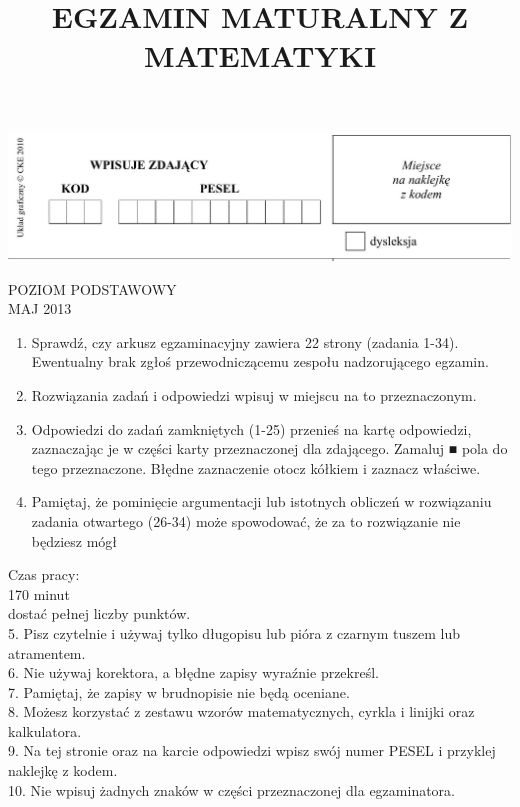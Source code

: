\documentclass[10pt]{article}
\title{EGZAMIN MATURALNY Z MATEMATYKI }
\author{}
\date{}
\begin{document}
\maketitle
\begin{center}
\includegraphics[max width=\textwidth]{2024_11_21_e0e8aab895018a50a9a7g-01}
\end{center}

POZIOM PODSTAWOWY\\
MAJ 2013

\begin{enumerate}
  \item Sprawdź, czy arkusz egzaminacyjny zawiera 22 strony (zadania 1-34). Ewentualny brak zgłoś przewodniczącemu zespołu nadzorującego egzamin.
  \item Rozwiązania zadań i odpowiedzi wpisuj w miejscu na to przeznaczonym.
  \item Odpowiedzi do zadań zamkniętych (1-25) przenieś na kartę odpowiedzi, zaznaczając je w części karty przeznaczonej dla zdającego. Zamaluj ■ pola do tego przeznaczone. Błędne zaznaczenie otocz kółkiem i zaznacz właściwe.
  \item Pamiętaj, że pominięcie argumentacji lub istotnych obliczeń w rozwiązaniu zadania otwartego (26-34) może spowodować, że za to rozwiązanie nie będziesz mógł
\end{enumerate}

Czas pracy:\\
170 minut\\
dostać pełnej liczby punktów.\\
5. Pisz czytelnie i używaj tylko długopisu lub pióra z czarnym tuszem lub atramentem.\\
6. Nie używaj korektora, a błędne zapisy wyraźnie przekreśl.\\
7. Pamiętaj, że zapisy w brudnopisie nie będą oceniane.\\
8. Możesz korzystać z zestawu wzorów matematycznych, cyrkla i linijki oraz kalkulatora.\\
9. Na tej stronie oraz na karcie odpowiedzi wpisz swój numer PESEL i przyklej naklejkę z kodem.\\
10. Nie wpisuj żadnych znaków w części przeznaczonej dla egzaminatora.
\end{document}
